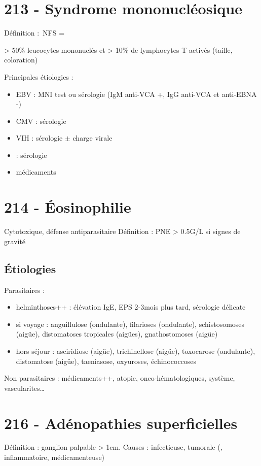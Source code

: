 \section{213 - Syndrome mononucléosique}%
\label{sec:syndrome_mononucleosique}
Définition : NFS = {> 50\% leucocytes mononuclés et > 10\% de lymphocytes T
  activés (\nearrow taille, coloration)

Principales étiologies : 
\begin{itemize}
  \item EBV : MNI test ou sérologie (IgM anti-VCA +, IgG anti-VCA et anti-EBNA -)
  \item CMV : sérologie
  \item VIH : sérologie $\pm$ charge virale
  \item {} : sérologie
  \item médicaments
\end{itemize}

\section{214 - Éosinophilie}
\label{sec:org4e42b49}
Cytotoxique, défense antiparasitaire
Définition : PNE > 0.5G/L
\faHospital{} si signes de gravité
\subsection{Étiologies}
\label{sec:orgdb9b717}
Parasitaires :
\begin{itemize}
\item helminthoses++ : élévation IgE, EPS 2-3mois plus tard, sérologie délicate
\item si voyage : anguillulose (ondulante), filarioses (ondulante), schistosomoses (aigüe), distomatoses tropicales (aigües), gnathostomoses (aigüe)
\item hors séjour : asciridiose (aigüe), trichinellose (aigüe), toxocarose (ondulante), distomatose (aigüe), taeniasose, oxyuroses, échinococcoses
\end{itemize}
Non parasitaires : médicaments++, atopie, onco-hématologiques, système,
vascularites\ldots{}

\section{216 - Adénopathies superficielles}%
\label{sec:adenopathies_superficielles}
Définition : ganglion palpable > 1cm. Causes : infectieuse, tumorale (,
inflammatoire, médicamenteuse)

}
